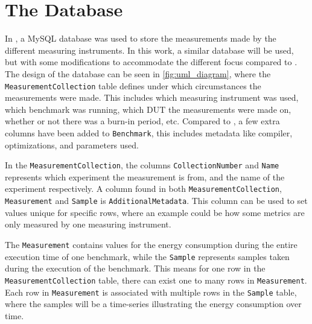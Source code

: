 \section{The Database}\label{app:database}

In \cite{biksbois}, a MySQL database was used to store the measurements made by the different measuring instruments. In this work, a similar database will be used, but with some modifications to accommodate the different focus compared to \cite{biksbois}. The design of the database can be seen in \cref{fig:uml_diagram}, where the \texttt{MeasurementCollection} table defines under which circumstances the measurements were made. This includes which measuring instrument was used, which benchmark was running, which DUT the measurements were made on, whether or not there was a burn-in period, etc. Compared to \cite{biksbois}, a few extra columns have been added to \texttt{Benchmark}, this includes metadata like compiler, optimizations, and parameters used.


In the \texttt{MeasurementCollection}, the columns \texttt{CollectionNumber} and \texttt{Name} represents which experiment the measurement is from, and the name of the experiment respectively. A column found in both \texttt{MeasurementCollection}, \texttt{Measurement} and \texttt{Sample} is \texttt{AdditionalMetadata}. This column can be used to set values unique for specific rows, where an example could be how some metrics are only measured by one measuring instrument.



The \texttt{Measurement} contains values for the energy consumption during the entire execution time of one benchmark, while the \texttt{Sample} represents samples taken during the execution of the benchmark. This means for one row in the \texttt{MeasurementCollection} table, there can exist one to many rows in \texttt{Measurement}. Each row in \texttt{Measurement} is associated with multiple rows in the \texttt{Sample} table, where the samples will be a time-series illustrating the energy consumption over time.


